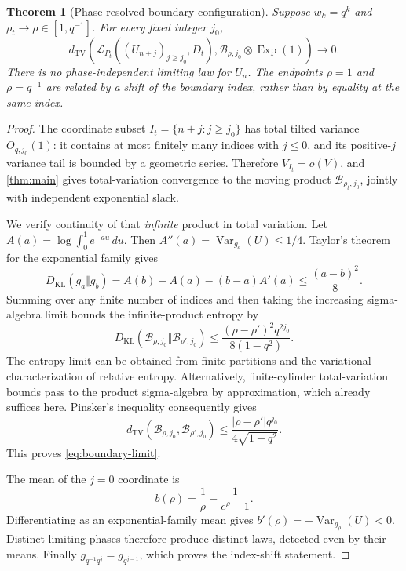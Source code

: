 \documentclass[11pt,a4paper]{article}
\numberwithin{equation}{section}
\newtheorem{theorem}{Theorem}[section]
\theoremstyle{definition}
\theoremstyle{remark}
\newcommand{\Pt}{P_t}
\newcommand{\TV}{d_{\mathrm{TV}}}
\newcommand{\KL}{D_{\mathrm{KL}}}
\newcommand{\Exp}{\operatorname{Exp}}
\newcommand{\Var}{\operatorname{Var}}
\newcommand{\Law}{\mathcal L}
\begin{document}
\begin{theorem}[Phase-resolved boundary configuration]\label{thm:boundary}
Suppose $w_k=q^k$ and $\rho_t\to\rho\in[1,q^{-1}]$. For every fixed
integer $j_0$,
\begin{equation}\label{eq:boundary-limit}
 \TV\left(\Law_{\Pt}((U_{n+j})_{j\ge j_0},D_t),
             \mathcal B_{\rho,j_0}\otimes\Exp(1)\right)\longrightarrow0.
\end{equation}
There is no phase-independent limiting law for $U_n$. The endpoints
$\rho=1$ and $\rho=q^{-1}$ are related by a shift of the boundary
index, rather than by equality at the same index.
\end{theorem}
\begin{proof}
The coordinate subset $I_t=\{n+j:j\ge j_0\}$ has total tilted
variance $O_{q,j_0}(1)$: it contains at most finitely many indices
with $j\le0$, and its positive-$j$ variance tail is bounded by a
geometric series. Therefore $V_{I_t}=o(V)$, and
\cref{thm:main} gives total-variation convergence to the moving
product $\mathcal B_{\rho_t,j_0}$, jointly with independent
exponential slack.

We verify continuity of that \emph{infinite} product in total
variation. Let $A(a)=\log\int_0^1e^{-au}\,du$. Then
$A''(a)=\Var_{g_a}(U)\le1/4$. Taylor's theorem for the exponential
family gives
\begin{equation}\label{eq:g-kl}
 \KL(g_a\Vert g_b)
 =A(b)-A(a)-(b-a)A'(a)\le\frac{(a-b)^2}{8}.
\end{equation}
Summing over any finite number of indices and then taking the
increasing sigma-algebra limit bounds the infinite-product entropy
by
\[
 \KL(\mathcal B_{\rho,j_0}\Vert\mathcal B_{\rho',j_0})
 \le\frac{(\rho-\rho')^2q^{2j_0}}{8(1-q^2)}.
\]
The entropy limit can be obtained from finite partitions and the
variational characterization of relative entropy. Alternatively,
finite-cylinder total-variation bounds pass to the product
sigma-algebra by approximation, which already suffices here.
Pinsker's inequality consequently gives
\begin{equation}\label{eq:boundary-lipschitz}
 \TV(\mathcal B_{\rho,j_0},\mathcal B_{\rho',j_0})
 \le\frac{|\rho-\rho'|q^{j_0}}{4\sqrt{1-q^2}}.
\end{equation}
This proves \cref{eq:boundary-limit}.

The mean of the $j=0$ coordinate is
\begin{equation}\label{eq:boundary-mean}
 b(\rho)=\frac1\rho-\frac1{e^\rho-1}.
\end{equation}
Differentiating as an exponential-family mean gives
$b'(\rho)=-\Var_{g_\rho}(U)<0$. Distinct limiting phases therefore
produce distinct laws, detected even by their means. Finally
$g_{q^{-1}q^j}=g_{q^{j-1}}$, which proves the index-shift statement.
\end{proof}
\end{document}
